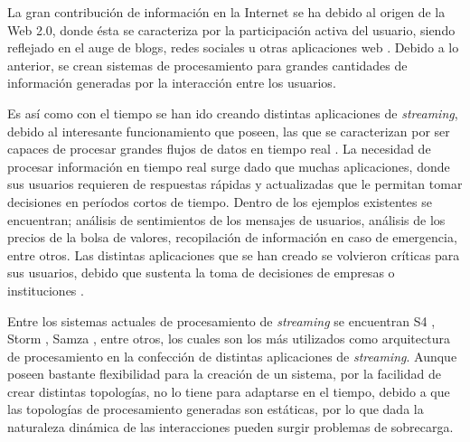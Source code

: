 \documentclass[12pt,letterpaper]{article}
\begin{document}
La gran contribución de información en la Internet se ha debido al origen de la Web 2.0,
donde ésta se caracteriza por la participación activa del usuario, siendo reflejado en el auge de blogs, redes sociales u otras aplicaciones web \cite{web2007oberhelman}. Debido a lo anterior, se crean sistemas de procesamiento para grandes cantidades de información generadas por la interacción entre los usuarios.

Es así como con el tiempo se han ido creando distintas aplicaciones de \textsl{streaming}, debido al interesante funcionamiento que poseen, las que se caracterizan por ser capaces de procesar grandes flujos de datos en tiempo real \cite{ChenZ14a}. La necesidad de procesar informaci\'on en tiempo real surge dado que muchas aplicaciones, donde sus usuarios requieren de respuestas r\'apidas y actualizadas que le permitan tomar decisiones en per\'iodos cortos de tiempo. Dentro de los ejemplos existentes se encuentran; análisis de sentimientos de los mensajes de usuarios, análisis de los precios de la bolsa de valores, recopilación de información en caso de emergencia, entre otros. Las distintas aplicaciones que se han creado se volvieron críticas para sus usuarios, debido que sustenta la toma de decisiones de empresas o instituciones \cite{Wenzel14}.

Entre los sistemas actuales de procesamiento de \textsl{streaming} se encuentran S4 \cite{s4yahoo}, Storm \cite{stormtwitter}, Samza \cite{samza}, entre otros, los cuales son los más utilizados como arquitectura de procesamiento en la confección de distintas aplicaciones de \textsl{streaming}. Aunque poseen bastante flexibilidad para la creación de un sistema, por la facilidad de crear distintas topologías, no lo tiene para adaptarse en el tiempo, debido a que las topolog\'ias de procesamiento generadas son est\'aticas, por lo que dada la naturaleza din\'amica de las interacciones pueden surgir problemas de sobrecarga.

\end{document}

